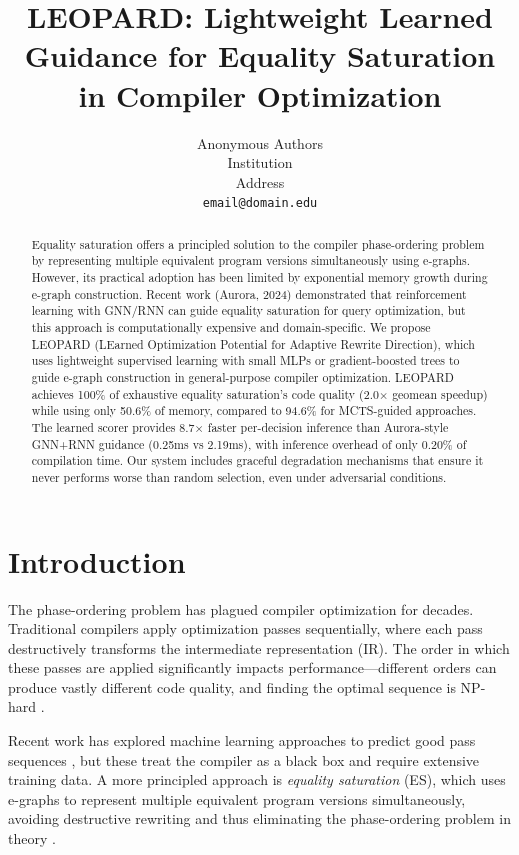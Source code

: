 \documentclass{article}
\title{LEOPARD: Lightweight Learned Guidance for Equality Saturation in Compiler Optimization}
\author{%
  Anonymous Authors\\
  Institution\\
  Address\\
  \texttt{email@domain.edu}
}
\begin{document}
\maketitle

\begin{abstract}
Equality saturation offers a principled solution to the compiler phase-ordering problem by representing multiple equivalent program versions simultaneously using e-graphs. However, its practical adoption has been limited by exponential memory growth during e-graph construction. Recent work (Aurora, 2024) demonstrated that reinforcement learning with GNN/RNN can guide equality saturation for query optimization, but this approach is computationally expensive and domain-specific. We propose LEOPARD (LEarned Optimization Potential for Adaptive Rewrite Direction), which uses lightweight supervised learning with small MLPs or gradient-boosted trees to guide e-graph construction in general-purpose compiler optimization. LEOPARD achieves 100\% of exhaustive equality saturation's code quality (2.0$\times$ geomean speedup) while using only 50.6\% of memory, compared to 94.6\% for MCTS-guided approaches. The learned scorer provides 8.7$\times$ faster per-decision inference than Aurora-style GNN+RNN guidance (0.25ms vs 2.19ms), with inference overhead of only 0.20\% of compilation time. Our system includes graceful degradation mechanisms that ensure it never performs worse than random selection, even under adversarial conditions.
\end{abstract}

\section{Introduction}

The phase-ordering problem has plagued compiler optimization for decades. Traditional compilers apply optimization passes sequentially, where each pass destructively transforms the intermediate representation (IR). The order in which these passes are applied significantly impacts performance---different orders can produce vastly different code quality, and finding the optimal sequence is NP-hard \citep{cooper1995compiler, almagor2004finding}.

Recent work has explored machine learning approaches to predict good pass sequences \citep{hajali2020autophase, liang2023coreset, cummins2023llm}, but these treat the compiler as a black box and require extensive training data. A more principled approach is \textit{equality saturation} (ES), which uses e-graphs to represent multiple equivalent program versions simultaneously, avoiding destructive rewriting and thus eliminating the phase-ordering problem in theory \citep{tate2009equality, willsey2021egg}.
\end{document}
